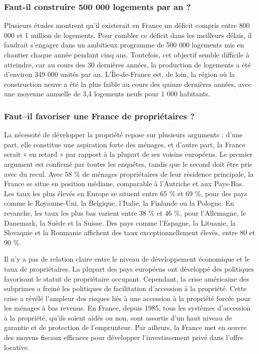 \documentclass[a4paper, 12pt]{report}
\begin{document}
\subsubsection{Faut-il construire 500 000 logements par an ?}

Plusieurs études montrent qu’il existerait en France un déficit compris entre 800 000 et 1 million de logements. Pour combler ce déficit dans les meilleurs délais, il faudrait s’engager dans un ambitieux programme de 500 000 logements mis en chantier chaque année pendant cinq ans. Toutefois, cet objectif semble difficile à atteindre, car au cours des 30 dernières années, la production de logements a été d'environ 349 000 unités par an. L’Île-de-France est, de loin, la région où la construction neuve a été la plus faible au cours des quinze dernières années, avec une moyenne annuelle de 3,4 logements neufs pour 1 000 habitants.

\subsubsection{Faut–il favoriser une France de propriétaires ?}

La nécessité de développer la propriété repose sur plusieurs arguments : d'une part, elle constitue une aspiration forte des ménages, et d'autre part, la France serait « en retard » par rapport à la plupart de ses voisins européens. Le premier argument est confirmé par toutes les enquêtes, tandis que le second doit être pris avec du recul. Avec 58 \% de ménages propriétaires de leur résidence principale, la France se situe en position médiane, comparable à l’Autriche et aux Pays-Bas. Les taux les plus élevés en Europe se situent entre 65 \% et 69 \%, pour des pays comme le Royaume-Uni, la Belgique, l’Italie, la Finlande ou la Pologne. En revanche, les taux les plus bas varient entre 38 \% et 46 \%, pour l’Allemagne, le Danemark, la Suède et la Suisse. Des pays comme l’Espagne, la Lituanie, la Slovaquie et la Roumanie affichent des taux exceptionnellement élevés, entre 80 et 90 \%.

Il n’y a pas de relation claire entre le niveau de développement économique et le taux de propriétaires. La plupart des pays européens ont développé des politiques favorisant le statut de propriétaire occupant. Cependant, la crise américaine des subprimes a freiné les politiques de facilitation d’accession à la propriété. Cette crise a révélé l’ampleur des risques liés à une accession à la propriété forcée pour les ménages à bas revenus. En France, depuis 1985, tous les systèmes d’accession à la propriété, qu'ils soient aidés ou non, sont assortis d’un haut niveau de garantie et de protection de l’emprunteur. Par ailleurs, la France met en œuvre des moyens fiscaux efficaces pour développer l’investissement privé dans l’offre locative.
\end{document}
